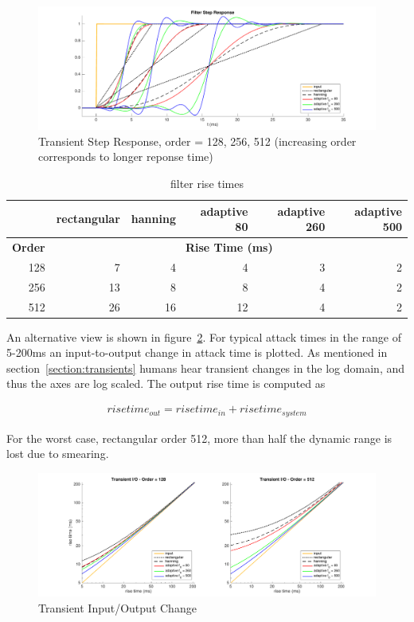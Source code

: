 \documentclass [11pt, proquest,oneside] {ganter_thesis}[2015/03/03]
\begin{document}
\begin{figure}[!ht]
  \centering
    \includegraphics[width=1\textwidth]{transient_1}
    \caption{Transient Step Response, order = 128, 256, 512 (increasing order corresponds to longer reponse time)}\label{fig:transient_1}
\end{figure}

\begin{table}
\begin{center}
\begin{tabular}{| r | r | r | r | r | r |}
  \hline
    & rectangular & hanning & adaptive 80 & adaptive 260 & adaptive 500 \\ \hline
  \textbf{Order} & \multicolumn{5}{|c|}{\textbf{Rise Time (ms)}} \\ \hline
  128 & 7 & 4 & 4 & 3 & 2 \\ \hline
  256 & 13 & 8 & 8 & 4 & 2 \\ \hline
  512 & 26 & 16 & 12 & 4 & 2 \\ \hline
\end{tabular}
\end{center}
\caption{filter rise times}\label{table:rise_times}
\end{table}

An alternative view is shown in figure~\ref{fig:transient_2}.  For typical attack times in the range of 5-200ms an input-to-output change in attack time is plotted.  As mentioned in section~\ref{section:transients} humans hear transient changes in the log domain, and thus the axes are log scaled.  The output rise time is computed as

\begin{align}
risetime_{out} = risetime_{in} + risetime_{system}
\end{align}

For the worst case, rectangular order 512, more than half the dynamic range is lost due to smearing.

\begin{figure}[!ht]
  \centering
    \includegraphics[width=1\textwidth]{transient_2}
    \caption{Transient Input/Output Change}\label{fig:transient_2}
\end{figure}
\end{document}
